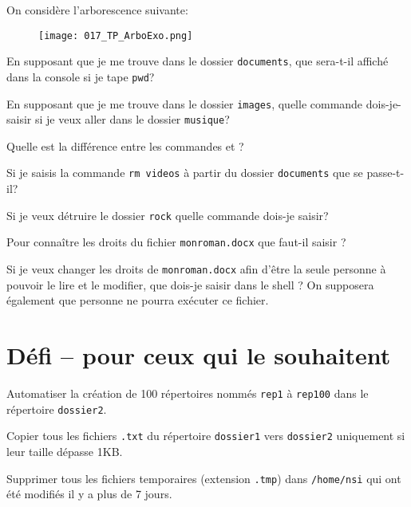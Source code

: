 \documentclass[12pt]{article}
\begin{document}
	\begin{MonExo}[A rendre]
		On considère l'arborescence suivante:
		
		\begin{figure}[H]
			\centering
			\texttt{[image: 017\_TP\_ArboExo.png]}
		\end{figure}
		\begin{alphenum}
			\item En supposant que je me trouve dans le dossier \texttt{documents}, que sera-t-il affiché dans la console si je tape \texttt{pwd}?
			\item En supposant que je me trouve dans le dossier \texttt{images}, quelle commande dois-je-saisir si je veux aller dans le dossier \texttt{musique}?
			\item Quelle est la différence entre les commandes  et ?
			\item Si je saisis la commande \texttt{rm videos} à partir du dossier \texttt{documents} que se passe-t-il?
			\item Si je veux détruire le dossier \texttt{rock} quelle commande dois-je saisir?
			\item Pour connaître les droits du fichier \texttt{monroman.docx} que faut-il saisir ?
			\item Si je veux changer les droits de \texttt{monroman.docx} afin d'être la seule personne à pouvoir le lire et le modifier, que dois-je saisir
dans le shell ? On supposera également que personne ne pourra exécuter ce fichier.
		\end{alphenum}
	\end{MonExo}
	
	\section{Défi -- pour ceux qui le souhaitent}
	\begin{MonExo}
		\begin{alphenum}
			\item Automatiser la création de 100 répertoires nommés \texttt{rep1} à \texttt{rep100} dans le répertoire \texttt{dossier2}.
			\item Copier tous les fichiers \texttt{.txt} du répertoire \texttt{dossier1} vers \texttt{dossier2} uniquement si leur taille dépasse 1KB.
			\item Supprimer tous les fichiers temporaires (extension \texttt{.tmp}) dans \texttt{/home/nsi} qui ont été modifiés il y a plus de 7 jours.
		\end{alphenum}
	\end{MonExo}
\end{document}
